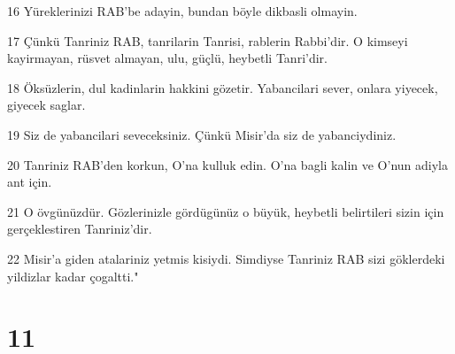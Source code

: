 \par 16 Yüreklerinizi RAB'be adayin, bundan böyle dikbasli olmayin.
\par 17 Çünkü Tanriniz RAB, tanrilarin Tanrisi, rablerin Rabbi'dir. O kimseyi kayirmayan, rüsvet almayan, ulu, güçlü, heybetli Tanri'dir.
\par 18 Öksüzlerin, dul kadinlarin hakkini gözetir. Yabancilari sever, onlara yiyecek, giyecek saglar.
\par 19 Siz de yabancilari seveceksiniz. Çünkü Misir'da siz de yabanciydiniz.
\par 20 Tanriniz RAB'den korkun, O'na kulluk edin. O'na bagli kalin ve O'nun adiyla ant için.
\par 21 O övgünüzdür. Gözlerinizle gördügünüz o büyük, heybetli belirtileri sizin için gerçeklestiren Tanriniz'dir.
\par 22 Misir'a giden atalariniz yetmis kisiydi. Simdiyse Tanriniz RAB sizi göklerdeki yildizlar kadar çogaltti."

\chapter{11}

